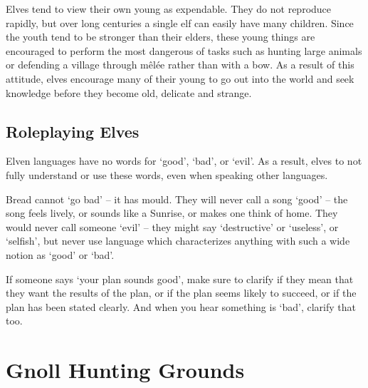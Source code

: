 \begin{multicols}{2}
Elves tend to view their own young as expendable.
They do not reproduce rapidly, but over long centuries a single elf can easily have many children.
Since the youth tend to be stronger than their elders, these young things are encouraged to perform the most dangerous of tasks such as hunting large animals or defending a village through m\^{e}l\'{e}e rather than with a bow.
As a result of this attitude, elves encourage many of their young to go out into the world and seek knowledge before they become old, delicate and strange.

\subsection{Roleplaying Elves}

Elven languages have no words for `good', `bad', or `evil'.
As a result, elves to not fully understand or use these words, even when speaking other languages.

Bread cannot `go bad' -- it has mould.
They will never call a song `good' -- the song feels lively, or sounds like a Sunrise, or makes one think of home.
They would never call someone `evil' -- they might say `destructive' or `useless', or `selfish', but never use language which characterizes anything with such a wide notion as `good' or `bad'.

If someone says `your plan sounds good', make sure to clarify if they mean that they want the results of the plan, or if the plan seems likely to succeed, or if the plan has been stated clearly.
And when you hear something is `bad', clarify that too.

\end{multicols}

\section[Gnolls]{Gnoll Hunting Grounds \Nl}
\label{GnollishGrounds}

